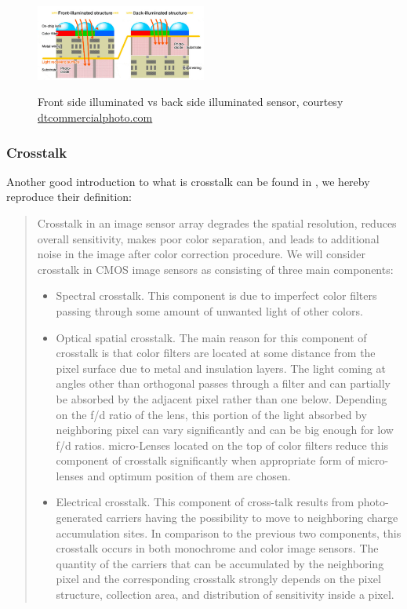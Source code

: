\documentclass{article}
\begin{document}
    
    \begin{figure}[H]
      \centering
      \includegraphics[width=0.5\textwidth]{../../figures/FSIvsBSI.png}\\
      \caption{Front side illuminated vs back side illuminated sensor, courtesy  \href{https://www.dtcommercialphoto.com/bsi-sensors-demystified/}{dtcommercialphoto.com}}
      \label{fig:fsi_vs_bsi}
    \end{figure}
    
    
    \subsubsection{Crosstalk}
     Another good introduction to what is crosstalk can be found in \cite{agranov2001crosstalk}, we hereby reproduce their definition:
     \blockquote{
     Crosstalk in an image sensor array degrades the spatial resolution, reduces overall sensitivity, makes poor color separation, and leads to additional noise in the image after color correction procedure. We will consider crosstalk in CMOS image sensors as consisting of three main components:
     \begin{itemize}
      \item Spectral crosstalk. This component is due to imperfect color filters passing through some amount of unwanted light of other colors.
      \item Optical spatial crosstalk. The main reason for this component of crosstalk is that color filters are located at some distance from the pixel surface due to metal and insulation layers. The light coming at angles other than orthogonal passes through a filter and can partially be absorbed by the adjacent pixel rather than one below. Depending on the f/d ratio of the lens, this portion of the light absorbed by neighboring pixel can vary significantly and can be big enough for low f/d ratios. micro-Lenses located on the top of color filters reduce this component of crosstalk significantly when appropriate form of micro-lenses and optimum position of them are chosen.
      \item Electrical crosstalk. This component of cross-talk results from photo-generated carriers having the possibility to move to neighboring charge accumulation sites. In comparison to the previous two components, this crosstalk occurs in both monochrome and color image sensors. The quantity of the carriers that can be accumulated by the neighboring pixel and the corresponding crosstalk strongly depends on the pixel structure, collection area, and distribution of sensitivity inside a pixel.
     \end{itemize}
      
      }
\end{document}

